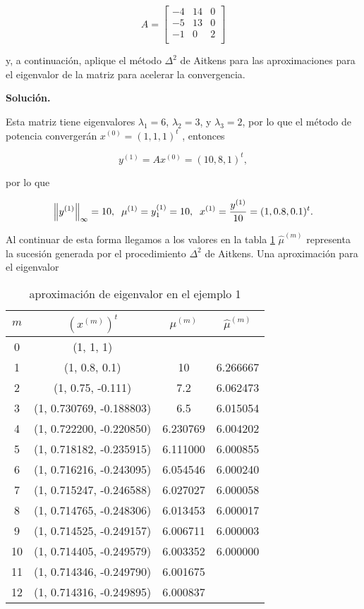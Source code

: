 \documentclass{report}
\numberwithin{subsection}{section} %
\begin{document}
    $$A =\begin{bmatrix}
        -4 & 14 & 0 \\
        -5 & 13 & 0 \\
        -1 & 0 & 2 \\
    \end{bmatrix}$$

    y, a continuación, aplique el método $\Delta^2$ de Aitkens para las aproximaciones para el eigenvalor de la matriz para acelerar la convergencia.

    {\bf Solución.}

    Esta matriz tiene eigenvalores $\lambda_1 = 6$, $\lambda_2 = 3$, y $\lambda_3 = 2$, por lo que el método de potencia convergerán $x^{(0)} = (1, 1, 1)^t$ , entonces

    $$y^{(1)} = Ax^{(0)} = (10, 8, 1)^t,$$

    por lo que

    $$\left\|y^{(1)}\right\|_{\infty} = 10, \;\; \mu^{(1)} = y_1^{(1)} = 10, \;\; x^{(1)} = {y^{(1)} \over 10} = (1, 0.8, 0.1)^t.$$

    Al continuar de esta forma llegamos a los valores en la tabla \ref{tab:ej1} $\hat{\mu}^{(m)}$ representa la sucesión generada por el procedimiento $\Delta^2$ de Aitkens. Una aproximación para el eigenvalor

    \begin{table}[h!]
        \centering
        \caption{aproximación de eigenvalor en el ejemplo 1}
        \label{tab:ej1}
        \begin{tabular}{|cccc|} \hline
            $m$ & $(x^{(m)})^t$ & $\mu^{(m)}$ & $\hat{\mu}^{(m)}$ \\ \hline
            0  &  (1, 1, 1)  & & \\
            1  &  (1, 0.8, 0.1)  &  10 & 6.266667 \\
            2  &  (1, 0.75, -0.111)  &  7.2 & 6.062473 \\
            3  &  (1, 0.730769, -0.188803)  &  6.5 & 6.015054 \\
            4  &  (1, 0.722200, -0.220850)  &  6.230769 & 6.004202 \\
            5  &  (1, 0.718182, -0.235915)  &  6.111000 & 6.000855  \\
            6  &  (1, 0.716216, -0.243095)  &  6.054546 & 6.000240 \\
            7  &  (1, 0.715247, -0.246588)  &  6.027027 & 6.000058  \\
            8  &  (1, 0.714765, -0.248306)  &  6.013453 & 6.000017  \\
            9  &  (1, 0.714525, -0.249157)  &  6.006711 & 6.000003  \\
            10  &  (1, 0.714405, -0.249579)  &  6.003352 & 6.000000 \\
            11  &  (1, 0.714346, -0.249790)  &  6.001675 & \\
            12  &  (1, 0.714316, -0.249895)  &  6.000837 & \\ \hline
        \end{tabular}
    \end{table}
\end{document}
